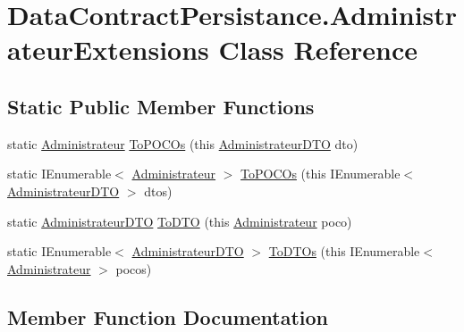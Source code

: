 \hypertarget{classDataContractPersistance_1_1AdministrateurExtensions}{}\section{Data\+Contract\+Persistance.\+Administrateur\+Extensions Class Reference}
\label{classDataContractPersistance_1_1AdministrateurExtensions}
\subsection*{Static Public Member Functions}
\begin{DoxyCompactItemize}
\item 
static \hyperlink{classModele_1_1Administrateur}{Administrateur} \hyperlink{classDataContractPersistance_1_1AdministrateurExtensions_a6d4e84d44ae7e797a641d5d89386ebbd}{To\+P\+O\+C\+Os} (this \hyperlink{classDataContractPersistance_1_1AdministrateurDTO}{Administrateur\+D\+TO} dto)
\item 
static I\+Enumerable$<$ \hyperlink{classModele_1_1Administrateur}{Administrateur} $>$ \hyperlink{classDataContractPersistance_1_1AdministrateurExtensions_abe157cf77951cd35db30b2af2222e93a}{To\+P\+O\+C\+Os} (this I\+Enumerable$<$ \hyperlink{classDataContractPersistance_1_1AdministrateurDTO}{Administrateur\+D\+TO} $>$ dtos)
\item 
static \hyperlink{classDataContractPersistance_1_1AdministrateurDTO}{Administrateur\+D\+TO} \hyperlink{classDataContractPersistance_1_1AdministrateurExtensions_ae6d8a0a1a882749000ff5a38507f7ddb}{To\+D\+TO} (this \hyperlink{classModele_1_1Administrateur}{Administrateur} poco)
\item 
static I\+Enumerable$<$ \hyperlink{classDataContractPersistance_1_1AdministrateurDTO}{Administrateur\+D\+TO} $>$ \hyperlink{classDataContractPersistance_1_1AdministrateurExtensions_ac578e782d57bdd8fc7d137d9d6a715fb}{To\+D\+T\+Os} (this I\+Enumerable$<$ \hyperlink{classModele_1_1Administrateur}{Administrateur} $>$ pocos)
\end{DoxyCompactItemize}


\subsection{Member Function Documentation}
\mbox{\label{classDataContractPersistance_1_1AdministrateurExtensions_ae6d8a0a1a882749000ff5a38507f7ddb}} 
